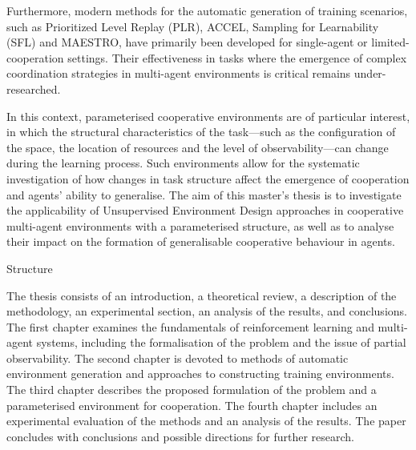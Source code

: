 Furthermore, modern methods for the automatic generation of training scenarios, such as Prioritized Level Replay (PLR), ACCEL, Sampling for Learnability (SFL) and MAESTRO, have primarily been developed for single-agent or limited-cooperation settings. Their effectiveness in tasks where the emergence of complex coordination strategies in multi-agent environments is critical remains under-researched.

In this context, parameterised cooperative environments are of particular interest, in which the structural characteristics of the task—such as the configuration of the space, the location of resources and the level of observability—can change during the learning process. Such environments allow for the systematic investigation of how changes in task structure affect the emergence of cooperation and agents’ ability to generalise.
The aim of this master’s thesis is to investigate the applicability of Unsupervised Environment Design approaches in cooperative multi-agent environments with a parameterised structure, as well as to analyse their impact on the formation of generalisable cooperative behaviour in agents.


Structure

The thesis consists of an introduction, a theoretical review, a description of the methodology, an experimental section, an analysis of the results, and conclusions.
The first chapter examines the fundamentals of reinforcement learning and multi-agent systems, including the formalisation of the problem and the issue of partial observability. The second chapter is devoted to methods of automatic environment generation and approaches to constructing training environments. The third chapter describes the proposed formulation of the problem and a parameterised environment for cooperation. The fourth chapter includes an experimental evaluation of the methods and an analysis of the results. The paper concludes with conclusions and possible directions for further research.
